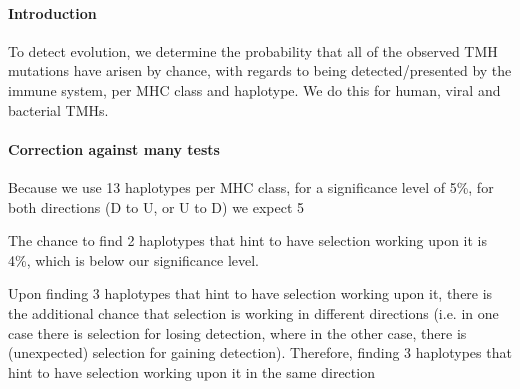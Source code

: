 \paragraph{Introduction}

To detect evolution, we determine the probability 
that all of the observed TMH mutations have arisen by chance,
with regards to being detected/presented by the immune system,
per MHC class and haplotype. We do this for human, viral and
bacterial TMHs.

\paragraph{Correction against many tests}

%


Because we use 13 haplotypes per MHC class,
for a significance level of 5\%,
for both directions (D to U, or U to D)
we expect 5%

The chance to find 2 haplotypes that hint to have selection working upon it
is 4\%, which is below our significance level.

Upon finding 3 haplotypes that hint to have selection working upon it,
there is the additional chance that selection is working in different
directions (i.e. in one case there is selection for losing detection,
where in the other case, there is (unexpected) selection for gaining
detection). Therefore, finding 3 haplotypes that hint to have selection working 
upon it in the same direction 

